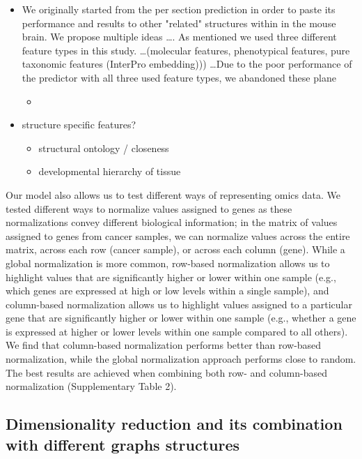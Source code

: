 \documentclass[]{article}
\begin{document}
\begin{itemize}
	\item We originally started from the per section prediction in order to paste its performance and results to other "related" structures within in the mouse brain. We propose multiple ideas \dots. As mentioned we used three different feature types in this study. \dots (molecular features, phenotypical features, pure taxonomic features (InterPro embedding))) \dots Due to the poor performance of the predictor with all three used feature types, we abandoned these plane
	\begin{itemize}
		\item 
	\end{itemize}
	\item structure specific features?
	\begin{itemize}
		\item structural ontology / closeness
		\item developmental hierarchy of tissue
	\end{itemize}
\end{itemize}

Our model also allows us to test different ways of representing omics data. We
tested different ways to normalize values assigned to genes as these normalizations
convey different biological information; in the matrix of values assigned to genes from
cancer samples, we can normalize values across the entire matrix, across each row
(cancer sample), or across each column (gene). While a global normalization is more
common, row-based normalization allows us to highlight values that are significantly
higher or lower within one sample (e.g., which genes are expressed at high or low levels within a single sample), and column-based normalization allows us to highlight values
assigned to a particular gene that are significantly higher or lower within one sample
(e.g., whether a gene is expressed at higher or lower levels within one sample compared
to all others). We find that column-based normalization performs better than row-based
normalization, while the global normalization approach performs close to random. The
best results are achieved when combining both row- and column-based normalization
(Supplementary Table 2).	

\subsection{Dimensionality reduction and its combination with different graphs structures}
\end{document}
